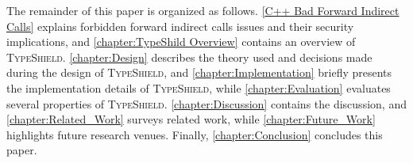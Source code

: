 The remainder of this paper is organized as follows.
\cref{C++ Bad Forward Indirect Calls} explains forbidden forward indirect calls issues and their security implications, and 
\cref{chapter:TypeShild Overview} contains an overview of \textsc{TypeShield}.
\cref{chapter:Design} describes the theory used and decisions made during the design of \textsc{TypeShield}, and
\cref{chapter:Implementation} briefly presents the implementation details of \textsc{TypeShield}, while
\cref{chapter:Evaluation} evaluates several properties of \textsc{TypeShield}.
\cref{chapter:Discussion} contains the discussion, and
\cref{chapter:Related_Work} surveys related work, while
\cref{chapter:Future_Work} highlights future research venues. 
Finally, \cref{chapter:Conclusion} concludes this paper.



